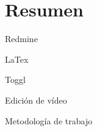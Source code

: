 \documentclass[a4paper,10pt]{scrartcl}
\begin{document}
\section{Resumen}

\begin{list}{}{}
	
	\item Redmine 
	
	\item LaTex
	
	\item Toggl
	
	\item Edición de vídeo
	
	\item Metodología de trabajo
	
\end{list}





\end{document}

